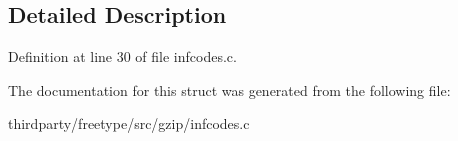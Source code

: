\subsection{Detailed Description}


Definition at line 30 of file infcodes.\+c.



The documentation for this struct was generated from the following file\+:\begin{DoxyCompactItemize}
\item 
thirdparty/freetype/src/gzip/infcodes.\+c\end{DoxyCompactItemize}
